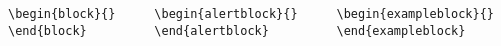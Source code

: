 \begin{columns}
    \begin{column}{.27\textwidth}
        \begin{verbatim}
\begin{block}{}
\end{block}
        \end{verbatim}
    \end{column}
    \begin{column}{.35\textwidth}
        \begin{verbatim}
\begin{alertblock}{}
\end{alertblock}
        \end{verbatim}
    \end{column}
    \begin{column}{.35\textwidth}
        \begin{verbatim}
\begin{exampleblock}{}
\end{exampleblock}
        \end{verbatim}
    \end{column}
\end{columns}